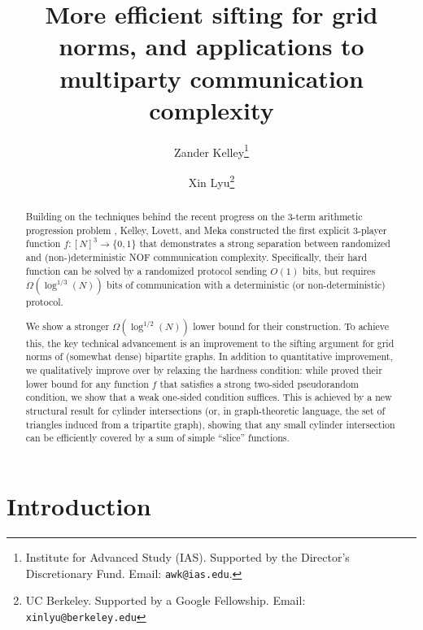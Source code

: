 \documentclass[11pt]{article}
\newcommand{\1}{ \mathbbm{1}}
\begin{document}
\title{More efficient sifting for grid norms, and applications to multiparty communication complexity}

\date{}

 \author{
Zander Kelley\thanks{
Institute for Advanced Study (IAS).
Supported by the Director's Discretionary Fund. 
Email: \texttt{awk@ias.edu}.
} \and
Xin Lyu\thanks{
UC Berkeley. Supported by a Google Fellowship. Email: \texttt{xinlyu@berkeley.edu}
}
}

\maketitle

\begin{abstract}
Building on the techniques behind the recent progress on the 3-term arithmetic progression problem \cite{KelleyM2023strong}, Kelley, Lovett, and Meka \cite{KelleyLM2024-nof} constructed the first explicit 3-player function $f:[N]^3 \rightarrow \{0,1\}$ that demonstrates a strong separation between randomized and (non-)deterministic NOF communication complexity. Specifically, their hard function can be solved by a randomized protocol sending $O(1)$ bits, but requires $\Omega(\log^{1/3}(N))$ bits of communication with a deterministic (or non-deterministic) protocol.

We show a stronger $\Omega(\log^{1/2}(N))$ lower bound for their construction. To achieve this, the key technical advancement is an improvement to the sifting argument for grid norms of (somewhat dense) bipartite graphs. In addition to quantitative improvement, we qualitatively improve over \cite{KelleyLM2024-nof} by relaxing the hardness condition: while \cite{KelleyLM2024-nof} proved their lower bound for any function $f$ that satisfies a strong two-sided pseudorandom condition, we show that a weak one-sided condition suffices. This is achieved by a new structural result for cylinder intersections (or, in graph-theoretic language, the set of triangles induced from a tripartite graph), showing that any small cylinder intersection can be efficiently covered by a sum of simple ``slice'' functions. 
\end{abstract}

\section{Introduction}
\end{document}
